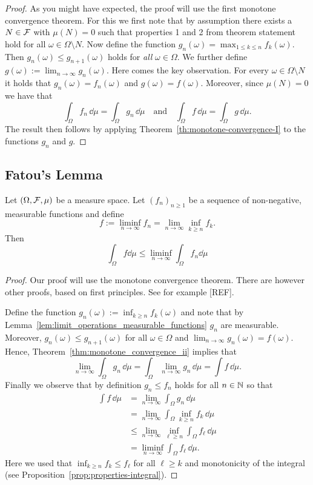 \begin{proof}
As you might have expected, the proof will use the first monotone convergence theorem. For this we first note that by assumption there exists a $N \in \mathcal F$ with $\mu(N) = 0$ such that properties 1 and 2 from theorem statement hold for all $\omega \in \Omega \setminus N$. Now define the function $g_n(\omega) = \max_{1 \le k \le n} f_k(\omega)$. Then $g_n(\omega) \le g_{n+1}(\omega)$ holds for \emph{all} $\omega \in \Omega$. We further define $g(\omega) := \lim_{n \to \infty} g_n(\omega)$. Here comes the key observation. For every $\omega \in \Omega\setminus N$ it holds that $g_n(\omega) = f_n(\omega)$ and $g(\omega) = f(\omega)$. Moreover, since $\mu(N) = 0$ we have that
\[
	\int_\Omega f_n \, \dd \mu = \int_\Omega g_n \, \dd \mu \quad \text{and} \quad
	\int_\Omega f \, \dd \mu = \int_\Omega g \, \dd \mu.
\]
The result then follows by applying Theorem~\ref{th:monotone-convergence-I} to the functions $g_n$ and $g$.
\end{proof}

\subsection{Fatou's Lemma}

\begin{theorem}\label{thm:fatou}
Let $(\Omega, \mathcal F, \mu)$ be a measure space. Let $(f_n)_{n \ge 1}$ be a sequence of non-negative, measurable functions and define
\[
	f := \liminf_{n\to \infty} f_n = \lim_{n \to \infty} \inf_{k \ge n} f_k.
\]
Then
\[
	\int_\Omega f \dd \mu \le \liminf_{n\to \infty} \int_\Omega f_n \dd \mu
\]
\end{theorem}

\begin{proof}
Our proof will use the monotone convergence theorem. There are however other proofs, based on first principles. See for example [REF].

Define the function $g_n(\omega) := \inf_{k \ge n} f_k(\omega)$ and note that by Lemma~\ref{lem:limit_operations_measurable_functions} $g_n$ are measurable. Moreover, $g_n(\omega) \le g_{n+1}(\omega)$ for all $\omega \in \Omega$ and $\lim_{n \to \infty} g_n(\omega) = f(\omega)$. Hence, Theorem~\ref{thm:monotone_convergence_ii} implies that
\[
	\lim_{n \to \infty} \int_\Omega g_n \, \dd \mu = \int_\Omega \lim_{n \to \infty} g_n \, \dd \mu
	= \int f \, \dd \mu. 
\]
Finally we observe that by definition $g_n \le f_n$ holds for all $n \in \mathbb N$ so that
\begin{align*}
	\int f \, \dd \mu &= \lim_{n \to \infty} \int_\Omega g_n \, \dd \mu \\
	&= \lim_{n \to \infty} \int_\Omega \inf_{k \ge n} f_k \, \dd \mu \\
	&\le \lim_{n \to \infty} \inf_{\ell \ge n} \int_\Omega  f_\ell \, \dd \mu\\
	&= \liminf_{n \to \infty} \int_\Omega  f_\ell \, \dd \mu.
\end{align*}
Here we used that $\inf_{k \ge n} f_k \le f_\ell$ for all $\ell \ge k$ and monotonicity of the integral (see Proposition~\ref{prop:properties-integral}).
\end{proof}

